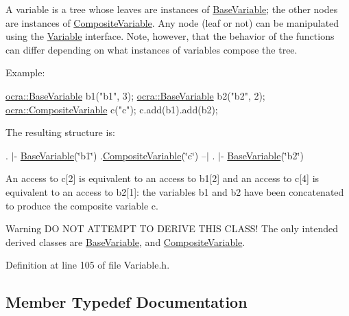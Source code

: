 A variable is a tree whose leaves are instances of \hyperlink{classocra_1_1BaseVariable}{Base\+Variable}; the other nodes are instances of \hyperlink{classocra_1_1CompositeVariable}{Composite\+Variable}. Any node (leaf or not) can be manipulated using the \hyperlink{classocra_1_1Variable}{Variable} interface. Note, however, that the behavior of the functions can differ depending on what instances of variables compose the tree.

Example\+: 
\begin{DoxyCode}
\hyperlink{classocra_1_1BaseVariable}{ocra::BaseVariable} b1(\textcolor{stringliteral}{"b1"}, 3);
\hyperlink{classocra_1_1BaseVariable}{ocra::BaseVariable} b2(\textcolor{stringliteral}{"b2"}, 2);
\hyperlink{classocra_1_1CompositeVariable}{ocra::CompositeVariable} c(\textcolor{stringliteral}{"c"});
c.add(b1).add(b2);
\end{DoxyCode}
 The resulting structure is\+:

. $\vert$-\/ \hyperlink{classocra_1_1BaseVariable}{Base\+Variable}(\char`\"{}b1\char`\"{}) .\hyperlink{classocra_1_1CompositeVariable}{Composite\+Variable}(\char`\"{}c\char`\"{}) --$\vert$ . $\vert$-\/ \hyperlink{classocra_1_1BaseVariable}{Base\+Variable}(\char`\"{}b2\char`\"{})

An access to c\mbox{[}2\mbox{]} is equivalent to an access to b1\mbox{[}2\mbox{]} and an access to c\mbox{[}4\mbox{]} is equivalent to an access to b2\mbox{[}1\mbox{]}\+: the variables b1 and b2 have been concatenated to produce the composite variable c.

\begin{DoxyWarning}{Warning}
DO N\+OT A\+T\+T\+E\+M\+PT TO D\+E\+R\+I\+VE T\+H\+IS C\+L\+A\+S\+S! The only intended derived classes are \hyperlink{classocra_1_1BaseVariable}{Base\+Variable}, and \hyperlink{classocra_1_1CompositeVariable}{Composite\+Variable}. 
\end{DoxyWarning}


Definition at line 105 of file Variable.\+h.



\subsection{Member Typedef Documentation}
\hypertarget{classocra_1_1Variable_a88444b2124cf5aab069f46734822f31f}{}\label{classocra_1_1Variable_a88444b2124cf5aab069f46734822f31f} 
